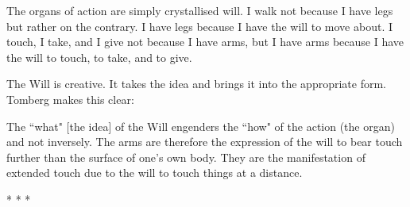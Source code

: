 \begin{quotex}
The organs of action are simply crystallised will. I walk not because I have legs but rather on the contrary. I have legs because I have the will to move about. I touch, I take, and I give not because I have arms, but I have arms because I have the will to touch, to take, and to give. 

\end{quotex}
The Will is creative. It takes the idea and brings it into the appropriate form. Tomberg makes this clear: 

\begin{quotex}
The ``what" [the idea] of the Will engenders the ``how" of the action (the organ) and not inversely. The arms are therefore the expression of the will to bear touch further than the surface of one's own body. They are the manifestation of extended touch due to the will to touch things at a distance. 

\end{quotex}


\begin{center}* * *\end{center}

